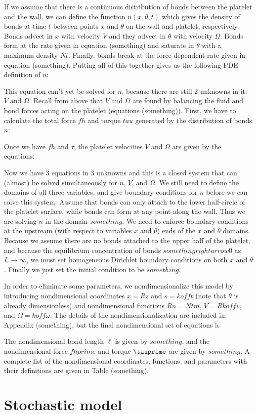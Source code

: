 If we assume that there is a continuous distribution of bonds between
the platelet and the wall, we can define the function $n(x, \theta,
t)$ which gives the density of bonds at time $t$ between points $x$
and $\theta$ on the wall and platelet, respectively. Bonds advect in
$x$ with velocity $V$ and they advect in $\theta$ with velocity
$\Omega$. Bonds form at the rate given in equation (something) and
saturate in $\theta$ with a maximum density $Nt$. Finally, bonds break
at the force-dependent rate given in equation (something). Putting all
of this together gives us the following PDE definition of $n$:

This equation can't yet be solved for $n$, because there are still 2
unknowns in it: $V$ and $\Omega$. Recall from above that $V$ and
$\Omega$ are found by balancing the fluid and bond forces acting on
the platelet (equations (something)). First, we have to calculate the
total force $fh$ and torque $tau$ generated by the distribution of
bonds $n$:

Once we have $fh$ and $\tau$, the platelet velocities $V$ and $\Omega$
are given by the equations: %

Now we have 3 equations in 3 unknowns and this is a closed system that
can (almost) be solved simultaneously for $n$, $V$, and $\Omega$. We
still need to define the domains of all three variables, and give
boundary conditions for $n$ before we can solve this system. Assume
that bonds can only attach to the lower half-circle of the platelet
surface, while bonds can form at any point along the wall. Thus we are
solving $n$ in the domain $something$. We need to enforce boundary
conditions at the upstream (with respect to variables $x$ and
$\theta$) ends of the $x$ and $\theta$ domains. Because we assume
there are no bonds attached to the upper half of the platelet, and
because the equilibrium concentration of bonds $something rightarrow
0$ as $L \rightarrow \infty$, we must set homogeneous Dirichlet
boundary conditions on both $x$ and $\theta$. Finally we just set the
initial condition to be $something$.

In order to eliminate some parameters, we nondimensionalize this model
by introducing nondimensional coordinates $x = Rz$ and $s = koff t$
(note that $\theta$ is already dimensionless) and nondimensional
functions $R n = Nt m$, $V = R koff v$, and $\Omega = koff
\omega$. The details of the nondimensionalization are included in
Appendix (something), but the final nondimensional set of equations is

The nondimensional bond length $\ell$ is given by $something$, and the
nondimensional force $fhprime$ and torque $\tauprime$ are given by
$something$. A complete list of the nondimensional coordinates,
functions, and parameters with their definitions are given in Table
(something).

\section{Stochastic model}
\label{sec:stochastic-model}

